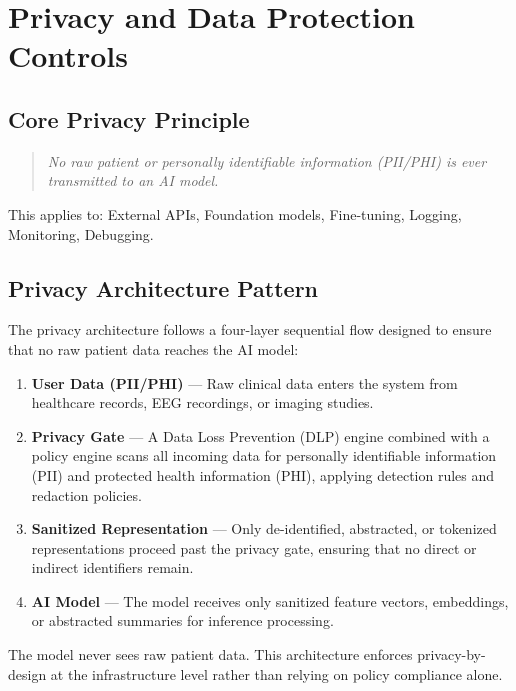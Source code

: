 \section{Privacy and Data Protection Controls}

\subsection{Core Privacy Principle}

\begin{quote}
\textit{No raw patient or personally identifiable information (PII/PHI) is ever transmitted to an AI model.}
\end{quote}

This applies to: External APIs, Foundation models, Fine-tuning, Logging, Monitoring, Debugging.

\subsection{Privacy Architecture Pattern}

The privacy architecture follows a four-layer sequential flow designed to ensure that no raw patient data reaches the AI model:

\begin{enumerate}
    \item \textbf{User Data (PII/PHI)} --- Raw clinical data enters the system from healthcare records, EEG recordings, or imaging studies.
    \item \textbf{Privacy Gate} --- A Data Loss Prevention (DLP) engine combined with a policy engine scans all incoming data for personally identifiable information (PII) and protected health information (PHI), applying detection rules and redaction policies.
    \item \textbf{Sanitized Representation} --- Only de-identified, abstracted, or tokenized representations proceed past the privacy gate, ensuring that no direct or indirect identifiers remain.
    \item \textbf{AI Model} --- The model receives only sanitized feature vectors, embeddings, or abstracted summaries for inference processing.
\end{enumerate}

\noindent The model never sees raw patient data. This architecture enforces privacy-by-design at the infrastructure level rather than relying on policy compliance alone.

